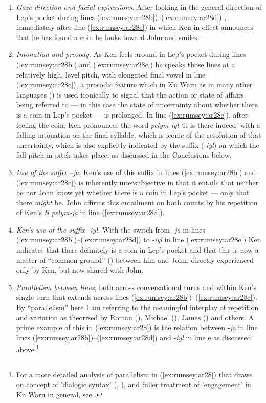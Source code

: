 \documentclass[output=paper]{langsci/langscibook}
\begin{document}
\begin{enumerate}
	\item \emph{Gaze direction and facial expressions.} After looking in the general direction of Lep’s pocket during lines (\ref{ex:rumsey:ar28b})--(\ref{ex:rumsey:ar28d}) , immediately after line (\ref{ex:rumsey:ar28e}) in which Ken in effect announces that he has found a coin he looks toward John and smiles. 
	\item \emph{Intonation and prosody.} As Ken feels around in Lep’s pocket during lines (\ref{ex:rumsey:ar28b}) and (\ref{ex:rumsey:ar28c}) he speaks those lines at a relatively high, level pitch, with elongated final vowel in line  (\ref{ex:rumsey:ar28c}), a prosodic feature which in Ku Waru as in many other languages (\citealt{Tedlock1983}) is used iconically to signal that the action or state of affairs being referred to — in this case the state of uncertainty about whether there is a coin in Lep’s pocket — is prolonged. In line  (\ref{ex:rumsey:ar28e}), after feeling the coin, Ken pronounces the word \textit{pelym-iyl} ‘it is there indeed’ with a falling intonation on the final syllable, which is iconic of the resolution of that uncertainty, which is also explicitly indicated by the suffix (-\textit{iyl}) on which the fall pitch in pitch takes place, as discussed in the Conclusions below.  
	\item \emph{Use of the suffix –\textit{ja}.} Ken’s use of this suffix in lines  (\ref{ex:rumsey:ar28b}) and  (\ref{ex:rumsey:ar28c}) is inherently intersubjective in that it entails that neither he nor John know yet whether there is a coin in Lep’s pocket — only that there \emph{might} be. John affirms this entailment on both counts by his repetition of Ken’s \textit{ti pelym-ja} in line  (\ref{ex:rumsey:ar28d}).
	\item \emph{Ken’s use of the suffix -\textit{iyl}.}  With the switch from -\textit{ja} in lines  (\ref{ex:rumsey:ar28b})--(\ref{ex:rumsey:ar28d}) to -\textit{iyl} in line  (\ref{ex:rumsey:ar28e}) Ken indicates that there definitely is a coin in Lep’s pocket and that this is now a matter of  “common ground” (\citealt{Clark1996}) between him and John, directly experienced only by Ken, but now shared with John.
	\item \emph{Parallelism between lines}, both across conversational turns and within Ken’s single turn that extends across lines  (\ref{ex:rumsey:ar28b})--(\ref{ex:rumsey:ar28c}). By “parallelism” here I am referring to the meaningful interplay of repetition and variation as theorized by Roman \citeauthor{Jakobson1960} (\citeyear{Jakobson1960}), Michael \citeauthor{Silverstein2004} (\citeyear{Silverstein2004}), James \citeauthor{Fox2014} (\citeyear{Fox2014}) and others. A prime example of this in (\ref{ex:rumsey:ar28}) is the relation between -\textit{ja} in line lines (\ref{ex:rumsey:ar28b})--(\ref{ex:rumsey:ar28d}) and -\textit{iyl} in line e as discussed above.\footnote{For a more detailed analysis of parallelism in (\ref{ex:rumsey:ar28}) that draws on \citeauthor{DuBois2014} concept of 'dialogic syntax' (\citeyear{DuBois2014}, \citeauthor{DuBoisGloria2014}), and fuller treatment of 'engagement' in Ku Waru in general, see \citealt{Rumsey2019}.}
\end{enumerate}
\end{document}
